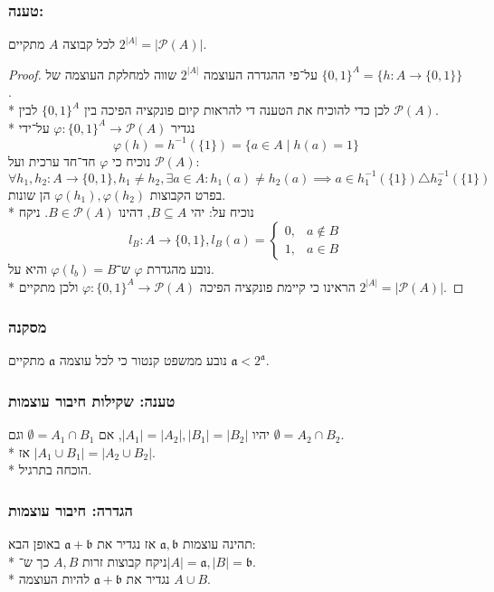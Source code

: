 \subsubsection{טענה: }
לכל קבוצה $A$ מתקיים $2^{|A|} = |\mathcal{P}(A)|$.
\begin{proof}
	על־פי ההגדרה העוצמה $2^{|A|}$ שווה למחלקת העוצמה של ${\{0, 1\}}^A = \{ h : A \to \{0, 1\}\}$. \\*
	לכן כדי להוכיח את הטענה די להראות קיום פונקציה הפיכה בין ${\{0, 1\}}^A$ לבין $\mathcal{P}(A)$. \\*
	נגדיר $\varphi : {\{0, 1\}}^A \to \mathcal{P}(A)$ על־ידי
	\[
		\varphi(h) = h^{-1}(\{1\}) = \{ a \in A \mid h(a) = 1\}
	\]
	נוכיח כי $\varphi$ חד־חד ערכית ועל $\mathcal{P}(A)$:
	\[
		\forall h_1, h_2 : A \to \{0, 1\}, h_1 \ne h_2,
		\exists a \in A : h_1(a) \ne h_2(a)
		\implies
		a \in h_1^{-1}(\{1\}) \triangle h_2^{-1}(\{1\})
	\]
	בפרט הקבוצות $\varphi(h_1), \varphi(h_2)$ הן שונות. \\*
	נוכיח על: יהי $B \subseteq A$, דהינו $B \in \mathcal{P}(A)$. ניקח
	\[
		l_B : A \to \{0, 1\}, l_B(a) = \begin{cases}
			0, & a \notin B \\
			1, & a \in B
		\end{cases}
	\]
	נובע מהגדרת $\varphi$ ש־$\varphi(l_b) = B$ והיא על. \\*
	הראינו כי קיימת פונקציה הפיכה $\varphi : {\{0, 1\}}^A \to \mathcal{P}(A)$ ולכן מתקיים $2^{|A|} = |\mathcal{P}(A)|$.
\end{proof}

\subsubsection{מסקנה}
נובע ממשפט קנטור כי לכל עוצמה $\mathfrak{a}$ מתקיים $\mathfrak{a} < 2^\mathfrak{a}$.

\subsubsection{טענה: שקילות חיבור עוצמות}
יהיו $|A_1| = |A_2|, |B_1| = |B_2|$, אם $\emptyset = A_1 \cap B_1$ וגם $\emptyset = A_2 \cap B_2$. \\*
אז $|A_1 \cup B_1| = |A_2 \cup B_2|$. \\*
הוכחה בתרגיל.

\subsubsection{הגדרה: חיבור עוצמות}
תהינה עוצמות $\mathfrak{a}, \mathfrak{b}$ אז נגדיר את $\mathfrak{a} + \mathfrak{b}$ באופן הבא: \\*
ניקח קבוצות זרות $A, B$ כך ש־$|A| = \mathfrak{a}, |B| = \mathfrak{b}$. \\*
נגדיר את $\mathfrak{a} + \mathfrak{b}$ להיות העוצמה $A \cup B$.


